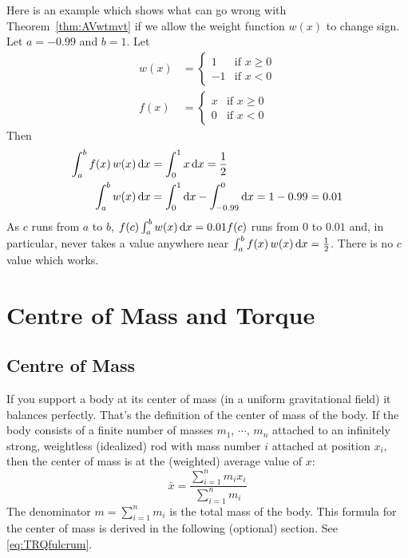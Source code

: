 \begin{eg}\label{eg:needPositive}
Here is an example which shows what can go wrong with Theorem~\ref{thm:AVwtmvt}
if we allow the weight function $w(x)$ to change sign. Let $a=-0.99$ and
$b=1$. Let
\begin{align*}
w(x)&=\begin{cases}1&\text{if $x\ge 0$}\\
                  -1&\text{if $x<0$} \end{cases} 
\\
f(x)&=\begin{cases}x&\text{if $x\ge 0$}\\
                  0&\text{if $x<0$} \end{cases} 
\end{align*} 
Then
\begin{align*}
\int_a^b f(x)\,w(x)\,\mathrm{d}x &= \int_0^1 x\,\mathrm{d}x =\frac{1}{2} 
\\ 
\int_a^b w(x)\,\mathrm{d}x &= \int_0^1 \mathrm{d}x -\int_{-0.99}^0\mathrm{d}x
                        = 1 - 0.99
                        = 0.01
\end{align*}
As $c$ runs from $a$ to $b$, $f(c)\int_a^b w(x)\,\mathrm{d}x=0.01 f(c)$ runs from 
$0$ to $0.01$ and, in particular, never takes a value anywhere near 
$\int_a^b f(x)\,w(x)\,\mathrm{d}x=\frac{1}{2}$. There is no $c$ value which works.
\end{eg}



\section{Centre of Mass and Torque}\label{sec com}
\subsection{Centre of Mass}
If you support a body at its center of mass (in a uniform gravitational
field) it balances perfectly. That's the definition of the center of mass
of the body.%
If the body consists of a finite number of masses $m_1$, $\cdots$, $m_n$
attached to an infinitely strong, weightless (idealized) rod with mass
number $i$ attached at position $x_i$, then the center of mass is
at the (weighted) average value of $x$:
\begin{equation}\label{eq:weightedrod}
\bar x =\frac{\sum_{i=1}^n m_ix_i}{\sum_{i=1}^n m_i}
\end{equation}
The denominator $m=\sum_{i=1}^n m_i$ is the total mass of the body.
This formula for the
center of mass is derived in the following (optional) section. See
\eqref{eq:TRQfulcrum}.


